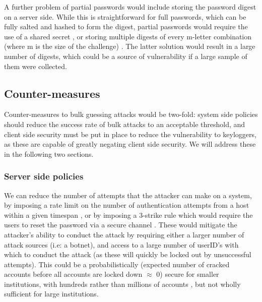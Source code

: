 \documentclass[british,11pt,a4paper]{article}
\begin{document}
A further problem of partial passwords would include storing the password digest on a server side. While this is straightforward for full passwords, which can be fully salted and hashed to form the digest, partial passwords would require the use of a shared secret \cite{smartarchitect}, or storing multiple digests of every m-letter combination (where m is the size of the challenge) \cite{smartarchitect}. The latter solution would result in a large number of digests, which could be a source of vulnerability if a large sample of them were collected. 





\subsection{Counter-measures}
Counter-measures to bulk guessing attacks would be two-fold: system side policies should reduce the success rate of bulk attacks to an acceptable threshold, and client side security must be put in place to reduce the vulnerability to keyloggers, as these are capable of greatly negating client side security. We will address these in the following two sections.

\subsubsection{Server side policies}
We can reduce the number of attempts that the attacker can make on a system, by imposing a rate limit on the number of authentication attempts from a host within a given timespan \cite{Florencio2007-yp}, or by imposing a 3-strike rule which would require the users to reset the password via a secure channel \cite{Florencio2007-yp}. These would mitigate the attacker's ability to conduct the attack by requiring either a larger number of attack sources (i.e: a botnet), and access to a large number of userID's with which to conduct the attack (as these will quickly be locked out by unsuccessful attempts). This could be a probabilistically (expected number of cracked accounts before all accounts are locked down $\approx$ 0) secure for smaller institutions, with hundreds rather than millions of accounts \cite{Florencio2007-yp}, but not wholly sufficient for large institutions. 
\end{document}
